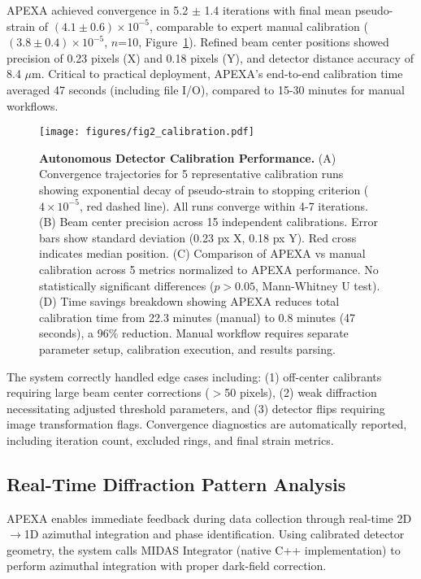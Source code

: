 \documentclass[11pt]{article}
\begin{document}
APEXA achieved convergence in 5.2 $\pm$ 1.4 iterations with final mean pseudo-strain of $(4.1 \pm 0.6) \times 10^{-5}$, comparable to expert manual calibration ($(3.8 \pm 0.4) \times 10^{-5}$, $n$=10, Figure~\ref{fig:calibration}). Refined beam center positions showed precision of 0.23 pixels (X) and 0.18 pixels (Y), and detector distance accuracy of 8.4 $\mu$m. Critical to practical deployment, APEXA's end-to-end calibration time averaged 47 seconds (including file I/O), compared to 15-30 minutes for manual workflows.

\begin{figure}[htbp]
\centering
\texttt{[image: figures/fig2\_calibration.pdf]}
\caption{\textbf{Autonomous Detector Calibration Performance.} (A) Convergence trajectories for 5 representative calibration runs showing exponential decay of pseudo-strain to stopping criterion ($4 \times 10^{-5}$, red dashed line). All runs converge within 4-7 iterations. (B) Beam center precision across 15 independent calibrations. Error bars show standard deviation (0.23 px X, 0.18 px Y). Red cross indicates median position. (C) Comparison of APEXA vs manual calibration across 5 metrics normalized to APEXA performance. No statistically significant differences ($p > 0.05$, Mann-Whitney U test). (D) Time savings breakdown showing APEXA reduces total calibration time from 22.3 minutes (manual) to 0.8 minutes (47 seconds), a 96\% reduction. Manual workflow requires separate parameter setup, calibration execution, and results parsing.}
\label{fig:calibration}
\end{figure}

The system correctly handled edge cases including: (1) off-center calibrants requiring large beam center corrections ($>$50 pixels), (2) weak diffraction necessitating adjusted threshold parameters, and (3) detector flips requiring image transformation flags. Convergence diagnostics are automatically reported, including iteration count, excluded rings, and final strain metrics.

\subsection{Real-Time Diffraction Pattern Analysis}

APEXA enables immediate feedback during data collection through real-time 2D$\rightarrow$1D azimuthal integration and phase identification. Using calibrated detector geometry, the system calls MIDAS Integrator (native C++ implementation) to perform azimuthal integration with proper dark-field correction.
\end{document}
